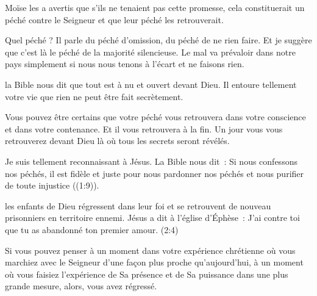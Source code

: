 Moïse les a avertis que s'ils ne tenaient pas cette promesse,
 cela constituerait un péché contre le Seigneur
 \ocadr{}et que leur péché les retrouverait.

Quel péché ? Il parle du péché d'omission, du péché de ne rien faire.
 Et je suggère que c'est là le péché de la majorité silencieuse.
 Le mal va prévaloir dans notre pays simplement
 si nous nous tenons à l'écart et ne faisons rien.


la Bible nous dit que tout est à nu et ouvert devant Dieu.
 Il entoure tellement votre vie que rien ne peut être fait secrètement.

Vous pouvez être certains que votre péché vous retrouvera
 dans votre conscience et dans votre contenance.
 Et il vous retrouvera à la fin.
 Un jour vous vous retrouverez devant Dieu
 là où tous les secrets seront révélés.

Je suis tellement reconnaissant à Jésus. La Bible nous dit~:
 \og Si nous confessons nos péchés, il est fidèle et juste
 pour nous pardonner nos péchés et nous purifier
 de toute injustice \fg{} ((1:9)). 

\dvrule






 les enfants de Dieu régressent dans leur foi
 et se retrouvent de nouveau prisonniers en territoire ennemi.
 Jésus a dit à l'église d'Éphèse~:
 \og J'ai contre toi que tu as abandonné ton premier amour. \fg{}
 (2:4)

Si vous pouvez penser à un moment dans votre expérience chrétienne
 où vous marchiez avec le Seigneur d'une façon plus proche qu'aujourd'hui,
 à un moment où vous faisiez l'expérience de Sa présence et de Sa puissance
 dans une plus grande mesure, alors, vous avez régressé.

